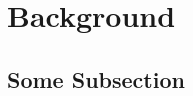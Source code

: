 \section{Background}
\label{sec:background}

\subsection{Some Subsection}
\label{subsec:somesubsec}

